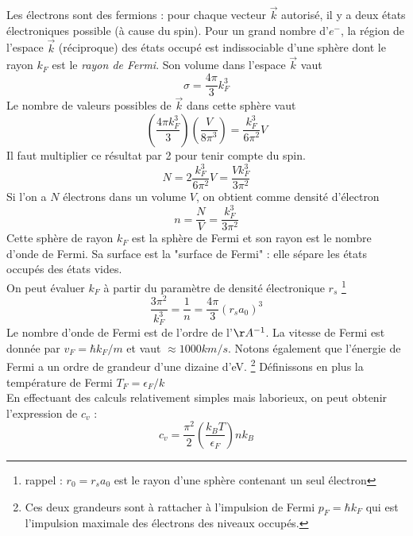 Les électrons sont des fermions : pour chaque vecteur $\vec k$ 
autorisé, il y a deux états électroniques possible (à cause du spin). Pour un 
grand nombre d'$e^-$, la région de l'espace $\vec{k}$ (réciproque) 
des états occupé est indissociable d'une sphère dont le rayon $k_F$
est le \textit{rayon de Fermi}. Son volume dans l'espace $\vec{k}$ vaut
\begin{equation}
	\sigma = \frac{4\pi}{3}k_F^3
\end{equation}
Le nombre de valeurs possibles de $\vec{k}$ dans cette sphère vaut 
\begin{equation}
	\left(\frac{4\pi k_F^3}{3}\right)\left(\frac{V}{8\pi^3}\right) = 
	\frac{k_F^3}{6\pi^2}V
\end{equation}
Il faut multiplier ce résultat par 2 pour tenir compte du spin.
\begin{equation}
	N = 2\frac{k_F^3}{6\pi^2}V = \frac{Vk_F^3}{3\pi^2}
\end{equation}
Si l'on a $N$ électrons dans un volume $V$, on obtient comme 
densité d'électron
\begin{equation}
	n = \frac{N}{V} = \frac{k_F^3}{3\pi^2}
\end{equation}
Cette sphère de rayon $k_F$ est la sphère de Fermi et son rayon est 
le nombre d'onde de Fermi. Sa surface est la "surface de Fermi" : 
elle sépare les états occupés des états vides.\\

On peut évaluer $k_F$ à partir du paramètre de densité électronique 
$r_s$ \footnote{rappel : $r_0 = r_s a_0$ est le rayon d'une sphère
 contenant un seul électron}
\begin{equation}
	\frac{3\pi^2}{k_F^3} = \frac{1}{n} = \frac{4\pi}{3}(r_sa_0)^3
\end{equation}
Le nombre d'onde de Fermi est de l'ordre de l'$\AA^{-1}$. La vitesse
de Fermi est donnée par $v_F = \hbar k_F/m$ et vaut $\approx 1000km/s$. 
Notons également que l'énergie de Fermi a un ordre de grandeur d'une 
dizaine d'eV. \footnote{Ces deux grandeurs sont à rattacher à l'impulsion
de Fermi $p_F = \hbar k_F$ qui est l'impulsion maximale des électrons
des niveaux occupés.} Définissons en plus la température de Fermi
$T_F = \epsilon_F/k$\\

En effectuant des calculs relativement simples mais laborieux, on 
peut obtenir l'expression de $c_v$ :
\begin{equation}
	c_v = \frac{\pi^2}{2}\left(\frac{k_BT}{\epsilon_F}\right)nk_B
\end{equation}

